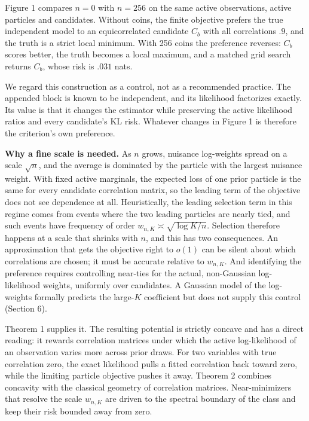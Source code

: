 \documentclass{article}
\begin{document}
Figure 1 compares \(n=0\) with \(n=256\) on the same active
observations, active particles and candidates. Without coins, the finite
objective prefers the true independent model to an equicorrelated
candidate \(C_b\) with all correlations \(.9\), and the truth is a
strict local minimum. With 256 coins the preference reverses: \(C_b\)
scores better, the truth becomes a local maximum, and a matched grid
search returns \(C_b\), whose risk is \(.031\) nats.

We regard this construction as a control, not as a recommended practice.
The appended block is known to be independent, and its likelihood
factorizes exactly. Its value is that it changes the estimator while
preserving the active likelihood ratios and every candidate's KL risk.
Whatever changes in Figure 1 is therefore the criterion's own
preference.

\textbf{Why a fine scale is needed.} As \(n\) grows, nuisance
log-weights spread on a scale \(\sqrt n\), and the average is dominated
by the particle with the largest nuisance weight. With fixed active
marginals, the expected loss of one prior particle is the same for every
candidate correlation matrix, so the leading term of the objective does
not see dependence at all. Heuristically, the leading selection term in
this regime comes from events where the two leading particles are nearly
tied, and such events have frequency of order
\(w_{n,K}\asymp\sqrt{\log K/n}\). Selection therefore happens at a scale
that shrinks with \(n\), and this has two consequences. An approximation
that gets the objective right to \(o(1)\) can be silent about which
correlations are chosen; it must be accurate relative to \(w_{n,K}\).
And identifying the preference requires controlling near-ties for the
actual, non-Gaussian log-likelihood weights, uniformly over candidates.
A Gaussian model of the log-weights formally predicts the large-\(K\)
coefficient but does not supply this control (Section 6).

Theorem 1 supplies it. The resulting potential is strictly concave and
has a direct reading: it rewards correlation matrices under which the
active log-likelihood of an observation varies more across prior draws.
For two variables with true correlation zero, the exact likelihood pulls
a fitted correlation back toward zero, while the limiting particle
objective pushes it away. Theorem 2 combines concavity with the
classical geometry of correlation matrices. Near-minimizers that resolve
the scale \(w_{n,K}\) are driven to the spectral boundary of the class
and keep their risk bounded away from zero.
\end{document}

